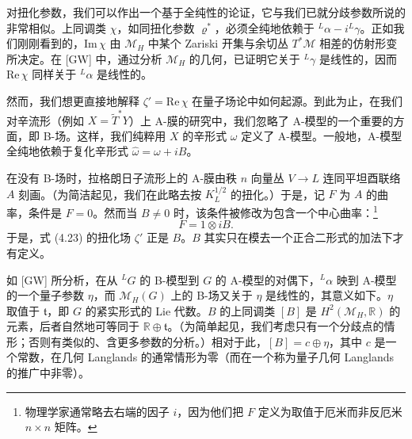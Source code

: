 \documentclass[11pt,a4paper]{article}
\begin{document}
对扭化参数，我们可以作出一个基于全纯性的论证，它与我们已就分歧参数所说的非常相似。上同调类 $\chi$，如同扭化参数 $\varrho^*$，必须全纯地依赖于 ${}^L\alpha-i{}^L\gamma$。正如我们刚刚看到的，$\mathrm{Im}\,\chi$ 由 $\mathcal{M}_H$ 中某个 Zariski 开集与余切丛 $T^*\mathcal{M}$ 相差的仿射形变所决定。在 [GW] 中，通过分析 $\mathcal{M}_H$ 的几何，已证明它关于 ${}^L\gamma$ 是线性的，因而 $\mathrm{Re}\,\chi$ 同样关于 ${}^L\alpha$ 是线性的。


然而，我们想更直接地解释 $\zeta'=\mathrm{Re}\,\chi$ 在量子场论中如何起源。到此为止，在我们对辛流形（例如 $X=\widetilde{T}^*Y$）上 A-膜的研究中，我们忽略了 A-模型的一个重要的方面，即 B-场。这样，我们纯粹用 $X$ 的辛形式 $\omega$ 定义了 A-模型。一般地，A-模型全纯地依赖于复化辛形式 $\widehat{\omega}=\omega+iB$。

在没有 B-场时，拉格朗日子流形上的 A-膜由秩 $n$ 向量丛 $V\to L$ 连同平坦酉联络 $A$ 刻画。（为简洁起见，我们在此略去按 $K_L^{1/2}$ 的扭化。）于是，记 $F$ 为 $A$ 的曲率，条件是 $F=0$。然而当 $B\neq0$ 时，该条件被修改为包含一个中心曲率：\footnote{物理学家通常略去右端的因子 $i$，因为他们把 $F$ 定义为取值于厄米而非反厄米 $n\times n$ 矩阵。}
\begin{equation}\tag{4.24}
F=1\otimes iB.
\end{equation}
于是，式 (4.23) 的扭化场 $\zeta'$ 正是 $B$。$B$ 其实只在模去一个正合二形式的加法下才有定义。



如 [GW] 所分析，在从 ${}^LG$ 的 B-模型到 $G$ 的 A-模型的对偶下，${}^L\alpha$ 映到 A-模型的一个量子参数 $\eta$，而 $\mathcal{M}_H(G)$ 上的 B-场又关于 $\eta$ 是线性的，其意义如下。$\eta$ 取值于 $\mathfrak{t}$，即 $G$ 的紧实形式的 Lie 代数。$B$ 的上同调类 $[B]$ 是 $H^2(\mathcal{M}_H,\mathbb{R})$ 的元素，后者自然地可等同于 $\mathbb{R}\oplus\mathfrak{t}$。（为简单起见，我们考虑只有一个分歧点的情形；否则有类似的、含更多参数的分析。）相对于此，$[B]=c\oplus\eta$，其中 $c$ 是一个常数，在几何 Langlands 的通常情形为零（而在一个称为量子几何 Langlands 的推广中非零）。
\end{document}
